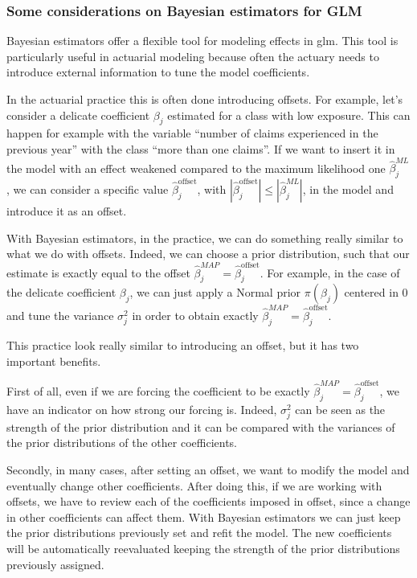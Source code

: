 \documentclass[a4paper, twoside, openright, 12pt]{report}
\theoremstyle{definition}
\theoremstyle{definition}
\theoremstyle{definition}
\theoremstyle{remark}
\begin{document}
\hypertarget{some-considerations-on-bayesian-estimators-for-glm}{%
\subsubsection{Some considerations on Bayesian estimators for GLM}\label{some-considerations-on-bayesian-estimators-for-glm}}

Bayesian estimators offer a flexible tool for modeling effects in \ac{glm}. This tool is particularly useful in actuarial modeling because often the actuary needs to introduce external information to tune the model coefficients.

In the actuarial practice this is often done introducing offsets. For example, let's consider a delicate coefficient \(\beta_j\) estimated for a class with low exposure. This can happen for example with the variable ``number of claims experienced in the previous year'' with the class ``more than one claims''. If we want to insert it in the model with an effect weakened compared to the maximum likelihood one \(\hat{\beta}_j^{ML}\), we can consider a specific value \(\hat{\beta}_j^{\text{offset}}\), with \(|\hat{\beta}_j^{\text{offset}}| \le |\hat{\beta}_j^{ML}|\), in the model and introduce it as an offset.

With Bayesian estimators, in the practice, we can do something really similar to what we do with offsets. Indeed, we can choose a prior distribution, such that our estimate is exactly equal to the offset \(\hat{\beta}_j^{MAP} = \hat{\beta}_j^{\text{offset}}\). For example, in the case of the delicate coefficient \(\beta_j\), we can just apply a Normal prior \(\pi(\beta_j)\) centered in \(0\) and tune the variance \(\sigma_j^2\) in order to obtain exactly \(\hat{\beta}_j^{MAP} = \hat{\beta}_j^{\text{offset}}\).

This practice look really similar to introducing an offset, but it has two important benefits.

First of all, even if we are forcing the coefficient to be exactly \(\hat{\beta}_j^{MAP} = \hat{\beta}_j^{\text{offset}}\), we have an indicator on how strong our forcing is. Indeed, \(\sigma_j^2\) can be seen as the strength of the prior distribution and it can be compared with the variances of the prior distributions of the other coefficients.

Secondly, in many cases, after setting an offset, we want to modify the model and eventually change other coefficients. After doing this, if we are working with offsets, we have to review each of the coefficients imposed in offset, since a change in other coefficients can affect them. With Bayesian estimators we can just keep the prior distributions previously set and refit the model. The new coefficients will be automatically reevaluated keeping the strength of the prior distributions previously assigned.
\end{document}
